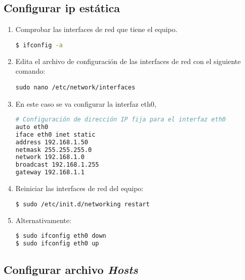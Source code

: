 \subsection{Configurar ip estática}

\begin{enumerate}
    
    \item Comprobar las interfaces de red que tiene el equipo.
    
\begin{lstlisting}[language=bash,style=mystyle]
$ ifconfig -a
\end{lstlisting}


    \item Edita el archivo de configuración de las interfaces de red con el siguiente comando:
    
\begin{lstlisting}[]
sudo nano /etc/network/interfaces
\end{lstlisting} 

    \item En este caso se va configurar la interfaz eth0,
    
\begin{lstlisting}[language=bash, style=mystyle]
# Configuración de dirección IP fija para el interfaz eth0
auto eth0
iface eth0 inet static
address 192.168.1.50
netmask 255.255.255.0
network 192.168.1.0
broadcast 192.168.1.255
gateway 192.168.1.1
\end{lstlisting} 


    \item Reiniciar las interfaces de red del equipo:
    
\begin{lstlisting}[language=bash,style=mystyle]
$ sudo /etc/init.d/networking restart
\end{lstlisting} 


    \item Alternativamente:
    
\begin{lstlisting}[language=bash,style=mystyle]
$ sudo ifconfig eth0 down 
$ sudo ifconfig eth0 up
\end{lstlisting} 

\end{enumerate}



\subsection{Configurar archivo \emph{Hosts}}

